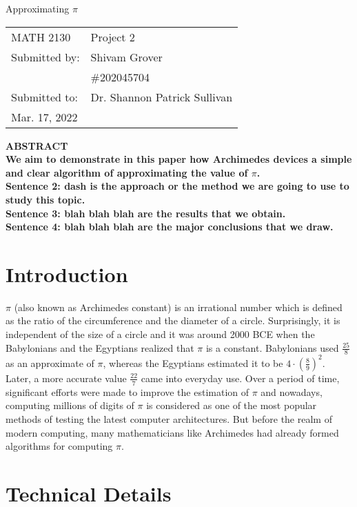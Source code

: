 \documentclass[12pt]{article}
\begin{document}
\begin{titlepage}
\begin{center}
\large Approximating $\displaystyle \pi$
\end{center}
\vspace{6cm}
\hfill\begin{tabular}{ll}
MATH 2130 & Project 2 \\
Submitted by: & Shivam Grover \\
& \#202045704 \\
Submitted to: & Dr. Shannon Patrick Sullivan \\
Mar. 17, 2022

\end{tabular}
\end{titlepage}

\bf{ABSTRACT} \\
We aim to demonstrate in this paper how Archimedes devices a simple and clear
algorithm of approximating the value of $\pi$.\\
Sentence 2: dash is the approach or the method we are going to use to study this topic.\\
Sentence 3: blah blah blah are the results that we obtain.\\
Sentence 4: blah blah blah are the major conclusions that we draw.\\

\section {Introduction}
$\pi$ (also known as Archimedes constant) is an irrational number which is defined as the ratio of the circumference and the diameter of a circle. Surprisingly, it is independent of the size of a circle and it was around 2000 BCE when the Babylonians and the Egyptians realized that $\pi$ is a constant. Babylonians used $\frac{25}{8}$ as an approximate of $\pi$, whereas the Egyptians estimated it to be $4\cdot(\frac{8}{9})^2$. Later, a more accurate value $\frac{22}{7}$ came into everyday use. Over a period of time, significant efforts were made to improve the estimation of $\pi$ and nowadays, computing millions of digits of $\pi$  is considered as one of the most popular methods of testing the latest computer architectures. But before the realm of modern computing, many mathematicians like Archimedes had already formed algorithms for computing $\pi$.


\section {Technical Details}
\iffalse It gives the mathematical background of the topic and states the methodology used for studying the topic. Can also include computer program. If run for 5 or 6 pages, then you should make sub sections for background, methodology and code. You should explain the inputs of the program, explain what the programs does on higher level and what are the outputs of the program.\fi
\end{document}
